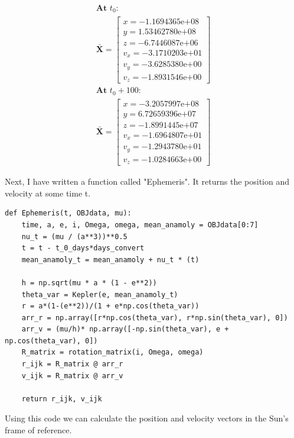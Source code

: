 \documentclass[12pt,twocolumn]{article}  %
\begin{document}
\[
\begin{array}{c}
\textbf{At } t_0: \\
\mathbf{\bar{X}} =
\begin{bmatrix}
x = -1.1694365\mathrm{e}{+08} \\
y =  1.53462780\mathrm{e}{+08} \\
z = -6.7446087\mathrm{e}{+06} \\
v_x = -3.1710203\mathrm{e}{+01} \\
v_y = -3.6285380\mathrm{e}{+00} \\
v_z = -1.8931546\mathrm{e}{+00}
\end{bmatrix}
\\[7em] %
\textbf{At } t_0 + 100: \\
\mathbf{\bar{X}} =
\begin{bmatrix}
x = -3.2057997\mathrm{e}{+08} \\
y =  6.72659396\mathrm{e}{+07} \\
z = -1.8991445\mathrm{e}{+07} \\
v_x = -1.6964807\mathrm{e}{+01} \\
v_y = -1.2943780\mathrm{e}{+01} \\
v_z = -1.0284663\mathrm{e}{+00}
\end{bmatrix}
\end{array}
\]


Next, I have written a function called "Ephemeris". It returns the position and velocity at some time t.
\begin{lstlisting}
def Ephemeris(t, OBJdata, mu):
    time, a, e, i, Omega, omega, mean_anamoly = OBJdata[0:7]
    nu_t = (mu / (a**3))**0.5
    t = t - t_0_days*days_convert
    mean_anamoly_t = mean_anamoly + nu_t * (t)

    h = np.sqrt(mu * a * (1 - e**2))
    theta_var = Kepler(e, mean_anamoly_t)
    r = a*(1-(e**2))/(1 + e*np.cos(theta_var))
    arr_r = np.array([r*np.cos(theta_var), r*np.sin(theta_var), 0])
    arr_v = (mu/h)* np.array([-np.sin(theta_var), e + np.cos(theta_var), 0])
    R_matrix = rotation_matrix(i, Omega, omega)
    r_ijk = R_matrix @ arr_r
    v_ijk = R_matrix @ arr_v
    
    return r_ijk, v_ijk
\end{lstlisting}

\noindent Using this code we can calculate the position and velocity vectors in the Sun's frame of reference. 
\end{document}
